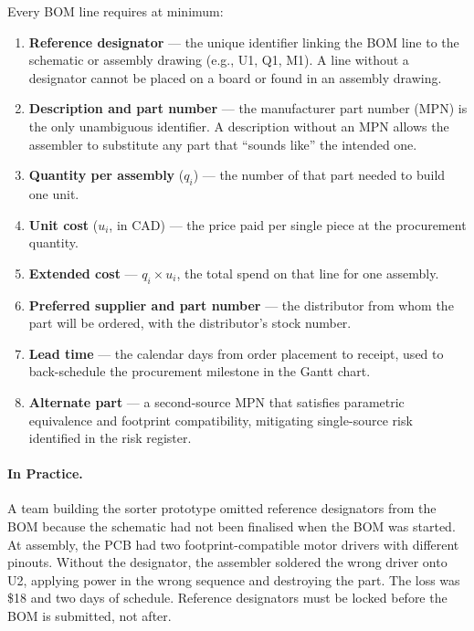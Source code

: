 Every BOM line requires at minimum:

\begin{enumerate}
  \item[(a)] \textbf{Reference designator} ---
        the unique identifier linking the BOM line to the schematic or assembly
        drawing (e.g., U1, Q1, M1).
        A line without a designator cannot be placed on a board or found in an
        assembly drawing.

  \item[(b)] \textbf{Description and part number} --- the manufacturer part
        number (MPN) is the only unambiguous identifier.
        A description without an MPN allows the assembler to substitute any
        part that ``sounds like'' the intended one.

  \item[(c)] \textbf{Quantity per assembly} ($q_i$) --- the number of that
        part needed to build one unit.

  \item[(d)] \textbf{Unit cost} ($u_i$, in CAD) --- the price paid per single
        piece at the procurement quantity.

  \item[(e)] \textbf{Extended cost} --- $q_i \times u_i$, the total spend on
        that line for one assembly.

  \item[(f)] \textbf{Preferred supplier and part number} --- the distributor
        from whom the part will be ordered, with the distributor's stock number.

  \item[(g)] \textbf{Lead time} --- the calendar days from order placement to
        receipt, used to back-schedule the procurement milestone in the Gantt
        chart.

  \item[(h)] \textbf{Alternate part} --- a second-source MPN that satisfies
        parametric equivalence and footprint compatibility, mitigating
        single-source risk identified in the risk register.
\end{enumerate}

\paragraph{In Practice.}
A team building the sorter prototype omitted reference designators from the BOM
because the schematic had not been finalised when the BOM was started.
At assembly, the PCB had two footprint-compatible motor drivers with different
pinouts.
Without the designator, the assembler soldered the wrong driver onto U2, applying
power in the wrong sequence and destroying the part.
The loss was \$18 and two days of schedule.
Reference designators must be locked before the BOM is submitted, not after.

